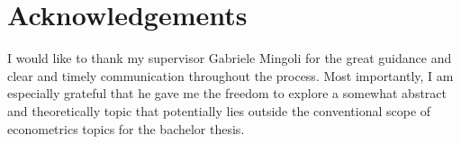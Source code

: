 \documentclass[a4paper,11pt]{article}
\theoremstyle{plain}
\numberwithin{theorem}{subsection}
\numberwithin{corollary}{subsection}
\numberwithin{proposition}{subsection}
\numberwithin{lemma}{subsection}
\numberwithin{assumption}{subsection}
\theoremstyle{definition}
\numberwithin{definition}{subsection}
\numberwithin{example}{subsection}
\numberwithin{remark}{subsection}
\numberwithin{notation}{subsection}
\begin{document}
\section*{Acknowledgements}
I would like to thank my supervisor Gabriele Mingoli for the great guidance and clear and timely communication throughout the process. Most importantly, I am especially grateful that he gave me the freedom to explore a somewhat abstract and theoretically topic that potentially lies outside the conventional scope of econometrics topics for the bachelor thesis.
\appendix





\end{document}
